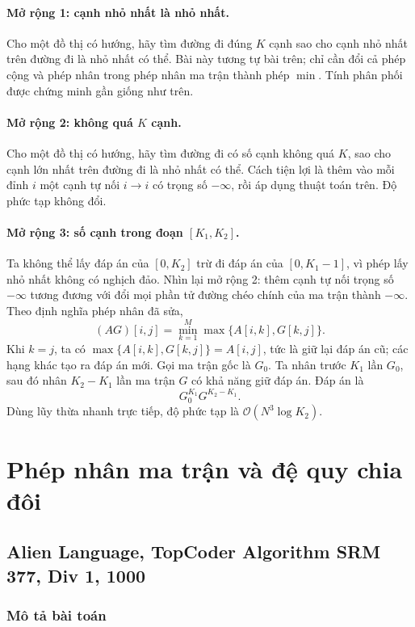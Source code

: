 \documentclass[11pt]{article}
\newcommand{\Oh}{\mathcal{O}}
\begin{document}
\paragraph{Mở rộng 1: cạnh nhỏ nhất là nhỏ nhất.}
Cho một đồ thị có hướng, hãy tìm đường đi đúng \(K\) cạnh sao cho cạnh nhỏ
nhất trên đường đi là nhỏ nhất có thể. Bài này tương tự bài trên; chỉ cần đổi
cả phép cộng và phép nhân trong phép nhân ma trận thành phép \(\min\). Tính
phân phối được chứng minh gần giống như trên.

\paragraph{Mở rộng 2: không quá \(K\) cạnh.}
Cho một đồ thị có hướng, hãy tìm đường đi có số cạnh không quá \(K\), sao cho
cạnh lớn nhất trên đường đi là nhỏ nhất có thể. Cách tiện lợi là thêm vào mỗi
đỉnh \(i\) một cạnh tự nối \(i\to i\) có trọng số \(-\infty\), rồi áp dụng
thuật toán trên. Độ phức tạp không đổi.

\paragraph{Mở rộng 3: số cạnh trong đoạn \([K_1,K_2]\).}
Ta không thể lấy đáp án của \([0,K_2]\) trừ đi đáp án của \([0,K_1-1]\), vì
phép lấy nhỏ nhất không có nghịch đảo. Nhìn lại mở rộng 2: thêm cạnh tự nối
trọng số \(-\infty\) tương đương với đổi mọi phần tử đường chéo chính của ma
trận thành \(-\infty\). Theo định nghĩa phép nhân đã sửa,
\[
  (AG)[i,j]=\min_{k=1}^{M}\max\{A[i,k],G[k,j]\}.
\]
Khi \(k=j\), ta có
\(\max\{A[i,k],G[k,j]\}=A[i,j]\), tức là giữ lại đáp án cũ; các hạng khác tạo
ra đáp án mới. Gọi ma trận gốc là \(G_0\). Ta nhân trước \(K_1\) lần \(G_0\),
sau đó nhân \(K_2-K_1\) lần ma trận \(G\) có khả năng giữ đáp án. Đáp án là
\[
  G_0^{K_1}G^{K_2-K_1}.
\]
Dùng lũy thừa nhanh trực tiếp, độ phức tạp là \(\Oh(N^3\log K_2)\).

\section{Phép nhân ma trận và đệ quy chia đôi}

\subsection{Alien Language, TopCoder Algorithm SRM 377, Div 1, 1000}

\subsubsection{Mô tả bài toán}
\end{document}
